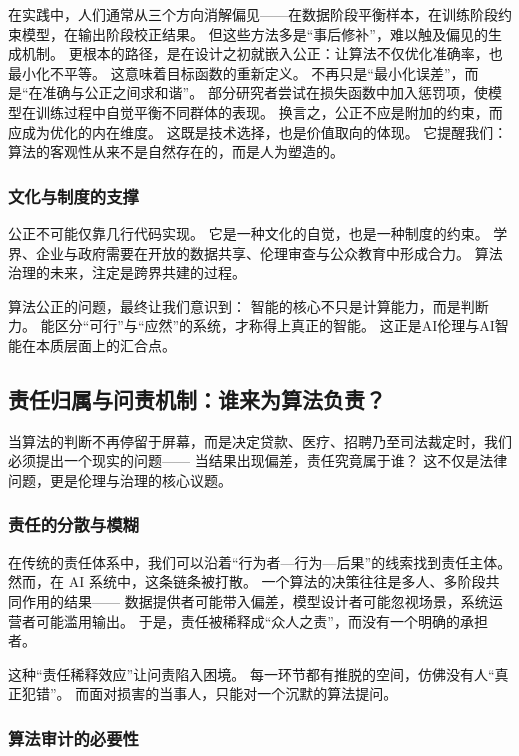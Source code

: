 在实践中，人们通常从三个方向消解偏见——在数据阶段平衡样本，在训练阶段约束模型，在输出阶段校正结果。  
但这些方法多是“事后修补”，难以触及偏见的生成机制。  
更根本的路径，是在设计之初就嵌入公正：让算法不仅优化准确率，也最小化不平等。
这意味着目标函数的重新定义。  
不再只是“最小化误差”，而是“在准确与公正之间求和谐”。  
部分研究者尝试在损失函数中加入惩罚项，使模型在训练过程中自觉平衡不同群体的表现。  
换言之，公正不应是附加的约束，而应成为优化的内在维度。  
这既是技术选择，也是价值取向的体现。  
它提醒我们：算法的客观性从来不是自然存在的，而是人为塑造的。

\subsubsection{文化与制度的支撑}

公正不可能仅靠几行代码实现。  
它是一种文化的自觉，也是一种制度的约束。  
学界、企业与政府需要在开放的数据共享、伦理审查与公众教育中形成合力。  
算法治理的未来，注定是跨界共建的过程。

算法公正的问题，最终让我们意识到：  
智能的核心不只是计算能力，而是判断力。  
能区分“可行”与“应然”的系统，才称得上真正的智能。  
这正是AI伦理与AI智能在本质层面上的汇合点。

\subsection{责任归属与问责机制：谁来为算法负责？}

当算法的判断不再停留于屏幕，而是决定贷款、医疗、招聘乃至司法裁定时，我们必须提出一个现实的问题——  
当结果出现偏差，责任究竟属于谁？  
这不仅是法律问题，更是伦理与治理的核心议题。

\subsubsection{责任的分散与模糊}

在传统的责任体系中，我们可以沿着“行为者—行为—后果”的线索找到责任主体。  
然而，在 AI 系统中，这条链条被打散。  
一个算法的决策往往是多人、多阶段共同作用的结果——  
数据提供者可能带入偏差，模型设计者可能忽视场景，系统运营者可能滥用输出。  
于是，责任被稀释成“众人之责”，而没有一个明确的承担者。

这种“责任稀释效应”让问责陷入困境。  
每一环节都有推脱的空间，仿佛没有人“真正犯错”。  
而面对损害的当事人，只能对一个沉默的算法提问。

\subsubsection{算法审计的必要性}

